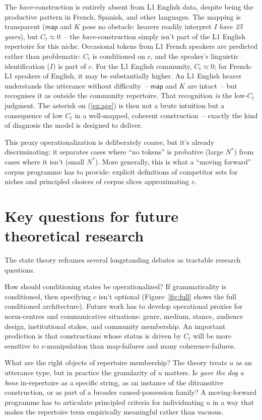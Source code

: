 \documentclass[12pt,letterpaper]{article}
\newcommand{\mention}[1]{\textit{#1}}
\begin{document}
The \mention{have}-construction is entirely absent from L1 English data, despite being the productive pattern in French, Spanish, and other languages. The mapping is transparent ($\mathsf{map}$ and $K$ pose no obstacle: hearers readily interpret \mention{I have 25 years}), but $C_t \approx 0$~-- the \mention{have}-construction simply isn't part of the L1 English repertoire for this niche. Occasional tokens from L1 French speakers are predicted rather than problematic: $C_t$ is conditioned on $c$, and the speaker's linguistic identification ($I$) is part of $c$. For the L1 English community, $C_t \approx 0$; for French-L1 speakers of English, it may be substantially higher. An L1 English hearer understands the utterance without difficulty~-- $\mathsf{map}$ and $K$ are intact~-- but recognises it as outside the community repertoire. That recognition \emph{is} the low-$C_t$ judgment. The asterisk on (\ref{ex:age}) is then not a brute intuition but a consequence of low $C_t$ in a well-mapped, coherent construction~-- exactly the kind of diagnosis the model is designed to deliver.

This proxy operationalization is deliberately coarse, but it's already discriminating: it separates cases where \enquote{no tokens} is probative (large $N^{\ast}$) from cases where it isn't (small $N^{\ast}$). More generally, this is what a \enquote{moving forward} corpus programme has to provide: explicit definitions of competitor sets for niches and principled choices of corpus slices approximating $c$.

\section[Questions for future research]{Key questions for future theoretical research}\label{sec:future}

The state theory reframes several longstanding debates as tractable research questions.

How should conditioning states be operationalized? If grammaticality is conditioned, then specifying $c$ isn't optional (Figure~\ref{fig:full} shows the full conditioned architecture). Future work has to develop operational proxies for norm-centres and communicative situations: genre, medium, stance, audience design, institutional stakes, and community membership. An important prediction is that constructions whose status is driven by $C_t$ will be more sensitive to $c$-manipulation than map-failures and many coherence-failures.

What are the right objects of repertoire membership? The theory treats $u$ as an utterance type, but in practice the granularity of $u$ matters. Is \mention{gave the dog a bone} in-repertoire as a specific string, as an instance of the ditransitive construction, or as part of a broader caused-possession family? A moving-forward programme has to articulate principled criteria for individuating $u$ in a way that makes the repertoire term empirically meaningful rather than vacuous.
\end{document}
